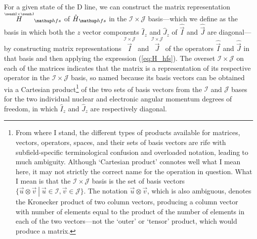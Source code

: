 For a given state of the D line, we can construct the matrix representation $\overset{\scriptscriptstyle{\mathcal{I}\times\mathcal{J}}}H_\up{hfs}$ of $\hat H_\up{hfs}$ in the $\mathcal{I}\times\mathcal{J}$ basis---which we define as the basis in which both the $z$ vector components $\hat{I}_z$ and $\hat{J}_z$ of $\hat{\vec I}$ and $\hat{\vec J}$ are diagonal---by constructing matrix representations $\overset{\scriptscriptstyle{\mathcal{I}\times\mathcal{J}}}{\vec I}$ and $\overset{\scriptscriptstyle{\mathcal{I}\times\mathcal{J}}}{\vec J}$ of the operators $\hat{\vec I}$ and $\hat{\vec J}$ in that basis and then applying the expression (\ref{eq:H_hfs}). The overset ${\mathcal{I} \times \mathcal{J}}$ on each of the matrices indicates that the matrix is a representation of its respective operator in the ${\mathcal{I} \times \mathcal{J}}$ basis, so named because its basis vectors can be obtained via a Cartesian product\footnote{From where I stand, the different types of products available for matrices, vectors, operators, spaces, and their sets of basis vectors are rife with subfield-specific terminological confusion and overloaded notation, leading to much ambiguity. Although `Cartesian product' connotes well what I mean here, it may not strictly the correct name for the operation in question. What I mean is that the ${\mathcal{I} \times \mathcal{J}}$ basis is the set of basis vectors $\{\left.\vec u \otimes \vec v\ \right|\ \vec u \in \mathcal{I}, \vec v\in\mathcal{J}\}$. The notation $\vec u \otimes \vec v$, which is also ambiguous, denotes the Kronecker product of two column vectors, producing a column vector with number of elements equal to the product of the number of elements in each of the two vectors---not the `outer' or `tensor' product, which would produce a matrix.} of the two sets of basis vectors from the $\mathcal{I}$ and $\mathcal{J}$ bases for the two individual nuclear and electronic angular momentum degrees of freedom, in which $\hat{I}_z$ and $\hat{J}_z$ are respectively diagonal.

